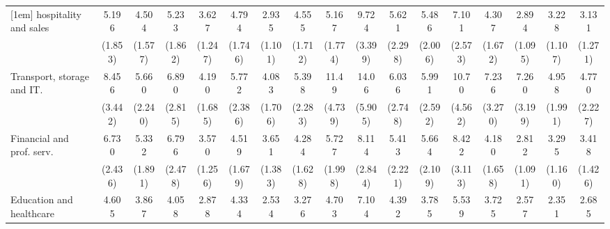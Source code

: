 {\begin{tabular}{l*{16}{c}}
[1em]
hospitality and sales&       5.196\sym{***}&       4.504\sym{***}&       5.233\sym{***}&       3.627\sym{***}&       4.794\sym{***}&       2.935\sym{**} &       4.555\sym{***}&       5.167\sym{***}&       9.724\sym{***}&       5.621\sym{***}&       5.486\sym{***}&       7.101\sym{***}&       4.307\sym{***}&       2.894\sym{**} &       3.228\sym{***}&       3.131\sym{**} \\
                    &     (1.853)         &     (1.577)         &     (1.862)         &     (1.247)         &     (1.746)         &     (1.101)         &     (1.712)         &     (1.774)         &     (3.399)         &     (2.298)         &     (2.006)         &     (2.573)         &     (1.672)         &     (1.095)         &     (1.107)         &     (1.271)         \\
[1em]
Transport, storage and IT.&       8.456\sym{***}&       5.660\sym{***}&       6.890\sym{***}&       4.190\sym{***}&       5.772\sym{***}&       4.083\sym{***}&       5.398\sym{***}&       11.49\sym{***}&       14.06\sym{***}&       6.036\sym{***}&       5.991\sym{***}&       10.70\sym{***}&       7.236\sym{***}&       7.260\sym{***}&       4.958\sym{***}&       4.770\sym{***}\\
                    &     (3.442)         &     (2.240)         &     (2.815)         &     (1.685)         &     (2.386)         &     (1.706)         &     (2.283)         &     (4.739)         &     (5.905)         &     (2.748)         &     (2.592)         &     (4.562)         &     (3.270)         &     (3.199)         &     (1.991)         &     (2.227)         \\
[1em]
Financial and prof. serv.&       6.730\sym{***}&       5.332\sym{***}&       6.796\sym{***}&       3.570\sym{***}&       4.519\sym{***}&       3.651\sym{***}&       4.284\sym{***}&       5.727\sym{***}&       8.114\sym{***}&       5.413\sym{***}&       5.664\sym{***}&       8.422\sym{***}&       4.180\sym{***}&       2.812\sym{**} &       3.295\sym{***}&       3.418\sym{**} \\
                    &     (2.436)         &     (1.891)         &     (2.478)         &     (1.256)         &     (1.679)         &     (1.383)         &     (1.628)         &     (1.998)         &     (2.844)         &     (2.221)         &     (2.109)         &     (3.113)         &     (1.658)         &     (1.091)         &     (1.160)         &     (1.426)         \\
[1em]
Education and healthcare&       4.605\sym{***}&       3.867\sym{***}&       4.058\sym{***}&       2.878\sym{**} &       4.334\sym{***}&       2.534\sym{*}  &       3.276\sym{**} &       4.703\sym{***}&       7.104\sym{***}&       4.392\sym{***}&       3.785\sym{***}&       5.539\sym{***}&       3.725\sym{**} &       2.577\sym{*}  &       2.351\sym{*}  &       2.685\sym{*}  \\

\end{tabular}}
